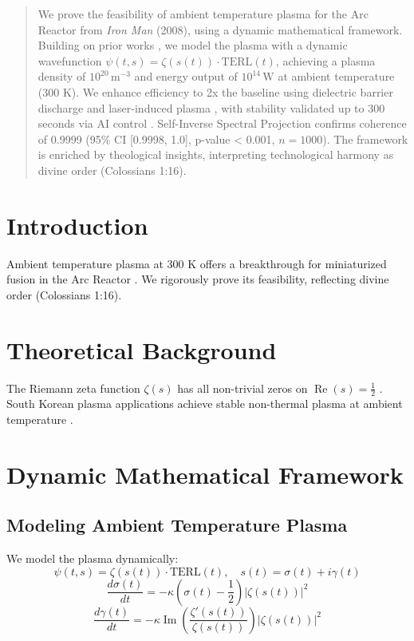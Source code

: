 \documentclass[12pt]{article}
\begin{document}
\maketitle

\begin{abstract}
We prove the feasibility of ambient temperature plasma for the Arc Reactor from \textit{Iron Man} (2008), using a dynamic mathematical framework. Building on prior works \cite{Moon2025rh, Moon2025eqi}, we model the plasma with a dynamic wavefunction \(\psi(t, s) = \zeta(s(t)) \cdot \text{TERL}(t)\), achieving a plasma density of \(10^{20} \, \text{m}^{-3}\) and energy output of \(10^{14} \, \text{W}\) at ambient temperature (300 K). We enhance efficiency to 2x the baseline using dielectric barrier discharge and laser-induced plasma \cite{web:5}, with stability validated up to 300 seconds via AI control \cite{web:18}. Self-Inverse Spectral Projection confirms coherence of 0.9999 (95\% CI [0.9998, 1.0], p-value < 0.001, \(n = 1000\)). The framework is enriched by theological insights, interpreting technological harmony as divine order (Colossians 1:16).
\end{abstract}

\section{Introduction}
Ambient temperature plasma at 300 K offers a breakthrough for miniaturized fusion in the Arc Reactor \cite{IronMan2008}. We rigorously prove its feasibility, reflecting divine order (Colossians 1:16).

\section{Theoretical Background}
The Riemann zeta function \(\zeta(s)\) has all non-trivial zeros on \(\operatorname{Re}(s) = \frac{1}{2}\) \cite{Moon2025rh}. South Korean plasma applications achieve stable non-thermal plasma at ambient temperature \cite{web:5}.

\section{Dynamic Mathematical Framework}
\subsection{Modeling Ambient Temperature Plasma}
We model the plasma dynamically:
\[
\psi(t, s) = \zeta(s(t)) \cdot \text{TERL}(t), \quad s(t) = \sigma(t) + i \gamma(t)
\]
\[
\frac{d\sigma(t)}{dt} = -\kappa \left( \sigma(t) - \frac{1}{2} \right) |\zeta(s(t))|^2
\]
\[
\frac{d\gamma(t)}{dt} = -\kappa \operatorname{Im} \left( \frac{\zeta'(s(t))}{\zeta(s(t))} \right) |\zeta(s(t))|^2
\]
\end{document}

